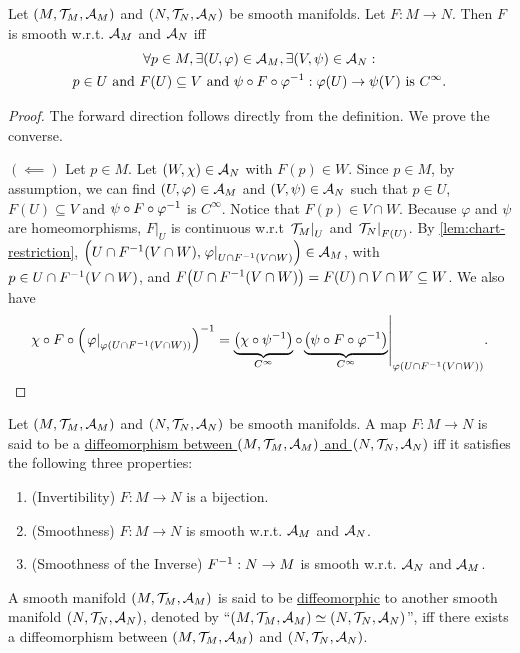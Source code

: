 \documentclass[11pt,reqno]{amsart}
\renewcommand{\phi}{\varphi}
\begin{document}
\begin{lemma}\label{lem:Cinfty-simple-criterion}
Let $(M,\mathcal{T}_M,\mathcal{A}_M)$ and $(N,\mathcal{T}_N,\mathcal{A}_N)$ be smooth manifolds.
Let $F:M\to N$.
Then $F$ is smooth w.r.t. $\mathcal{A}_M$ and $\mathcal{A}_N$ iff
\begin{gather*}
\forall p\in M,
\exists(U,\phi)\in\A_M,
\exists(V,\psi)\in\A_N:\\
p\in U\tand
F(U)\subseteq V\tand
\psi\circ F\circ\phi\inv:\phi(U)\to\psi(V)~\text{is $C^\infty$}.
\end{gather*}
\end{lemma}
\begin{proof}
The forward direction follows directly from the definition. We prove the converse.

$(\impliedby)$
Let $p\in M$. Let $(W,\chi)\in\mathcal{A}_N$ with $F(p)\in W$.
Since $p\in M$, by assumption, we can find
$(U,\phi)\in\A_M$ and $(V,\psi)\in\mathcal{A}_N$ such that
$p\in U$, $F(U)\subseteq V$ and $\psi\circ F\circ\phi\inv$ is $C^\infty$.
Notice that $F(p)\in V\cap W$.
Because $\phi$ and $\psi$ are homeomorphisms,
$F|_U$ is continuous w.r.t $\eval{\T_M}_U$ and $\eval{\T_N}_{F(U)}$.
By \ref{lem:chart-restriction},
$\Br{U\cap F\inv(V\cap W),\eval{\phi}_{U\cap F\inv(V\cap W)}}\in\A_M$, with $p\in U\cap F^{-1}(V\cap W)$,
and $F\Br{U\cap F\inv(V\cap W)}=F(U)\cap V\cap W\subseteq W$.
We also have
\[
\chi\circ F\circ\Br{\eval{\phi}_{\phi(U\cap F\inv(V\cap W))}}\inv
=\underbrace{\Br{\chi\circ\psi\inv}}_{C^\infty}\circ
\eval{\underbrace{\Br{\psi\circ F\circ\phi\inv}}_{C^\infty}}_{\phi(U\cap F\inv(V\cap W))}.
\]
\end{proof}

\begin{Def}
Let $(M,\mathcal{T}_M,\mathcal{A}_M)$ and $(N,\mathcal{T}_N,\mathcal{A}_N)$ be smooth manifolds.
A map $F:M\to N$ is said to be a
\ul{diffeomorphism between $(M,\mathcal{T}_M,\mathcal{A}_M)$ and $(N,\mathcal{T}_N,\mathcal{A}_N)$}
iff it satisfies
the following three properties:
\begin{enumerate}
\item (Invertibility) $F:M\to N$ is a bijection.
\item (Smoothness) $F:M\to N$ is smooth w.r.t. $\mathcal{A}_M$ and $\mathcal{A}_N$.
\item (Smoothness of the Inverse) $F^{-1}:N\to M$ is smooth w.r.t. $\mathcal{A}_N$ and $\mathcal{A}_M$.
\end{enumerate}
\end{Def}

\begin{Def}
A smooth manifold $(M,\mathcal{T}_M,\mathcal{A}_M)$
is said to be \ul{diffeomorphic} to another
smooth manifold $(N,\mathcal{T}_N,\mathcal{A}_N)$,
denoted by ``$(M,\mathcal{T}_M,\mathcal{A}_M)\simeq(N,\mathcal{T}_N,\mathcal{A}_N)$'', iff
there exists a diffeomorphism between $(M,\mathcal{T}_M,\mathcal{A}_M)$ and $(N,\mathcal{T}_N,\mathcal{A}_N)$.
\end{Def}
\end{document}
